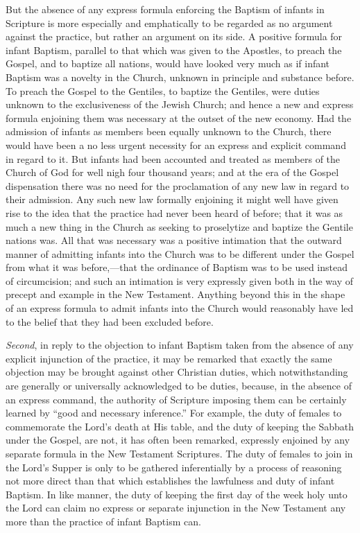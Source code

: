 \documentclass[
]{book}
\begin{document}
But the absence of any express formula enforcing the Baptism of infants in Scripture is more especially and emphatically to be regarded as no argument against the practice, but rather an argument on its side. A positive formula for infant Baptism, parallel to that which was given to the Apostles, to preach the Gospel, and to baptize all nations, would have looked very much as if infant Baptism was a novelty in the Church, unknown in principle and substance before. To preach the Gospel to the Gentiles, to baptize the Gentiles, were duties unknown to the exclusiveness of the Jewish Church; and hence a new and express formula enjoining them was necessary at the outset of the new economy. Had the admission of infants as members been equally unknown to the Church, there would have been a no less urgent necessity for an express and explicit command in regard to it. But infants had been accounted and treated as members of the Church of God for well nigh four thousand years; and at the era of the Gospel dispensation there was no need for the proclamation of any new law in regard to their admission. Any such new law formally enjoining it might well have given rise to the idea that the practice had never been heard of before; that it was as much a new thing in the Church as seeking to proselytize and baptize the Gentile nations was. All that was necessary was a positive intimation that the outward manner of admitting infants into the Church was to be different under the Gospel from what it was before,---that the ordinance of Baptism was to be used instead of circumcision; and such an intimation is very expressly given both in the way of precept and example in the New Testament. Anything beyond this in the shape of an express formula to admit infants into the Church would reasonably have led to the belief that they had been excluded before.

\emph{Second}, in reply to the objection to infant Baptism taken from the absence of any explicit injunction of the practice, it may be remarked that exactly the same objection may be brought against other Christian duties, which notwithstanding are generally or universally acknowledged to be duties, because, in the absence of an express command, the authority of Scripture imposing them can be certainly learned by ``good and necessary inference.'' For example, the duty of females to commemorate the Lord's death at His table, and the duty of keeping the Sabbath under the Gospel, are not, it has often been remarked, expressly enjoined by any separate formula in the New Testament Scriptures. The duty of females to join in the Lord's Supper is only to be gathered inferentially by a process of reasoning not more direct than that which establishes the lawfulness and duty of infant Baptism. In like manner, the duty of keeping the first day of the week holy unto the Lord can claim no express or separate injunction in the New Testament any more than the practice of infant Baptism can.
\end{document}
